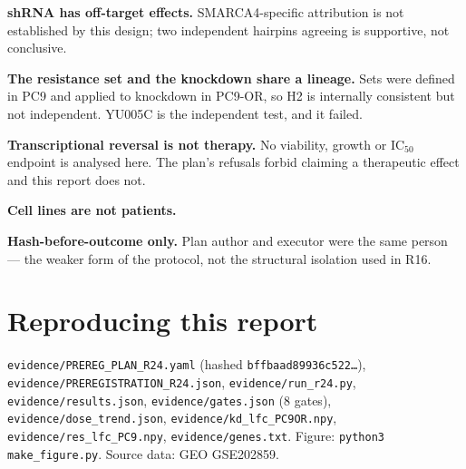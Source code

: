 \documentclass[11pt,a4paper]{article}
\begin{document}
\textbf{shRNA has off-target effects.} SMARCA4-specific attribution is not established by this
design; two independent hairpins agreeing is supportive, not conclusive.

\textbf{The resistance set and the knockdown share a lineage.} Sets were defined in PC9 and applied
to knockdown in PC9-OR, so H2 is internally consistent but not independent. YU005C is the
independent test, and it failed.

\textbf{Transcriptional reversal is not therapy.} No viability, growth or IC$_{50}$ endpoint is
analysed here. The plan's refusals forbid claiming a therapeutic effect and this report does not.

\textbf{Cell lines are not patients.}

\textbf{Hash-before-outcome only.} Plan author and executor were the same person --- the weaker form
of the protocol, not the structural isolation used in R16.

\section*{Reproducing this report}

\texttt{evidence/PREREG\_PLAN\_R24.yaml} (hashed \texttt{bffbaad89936c522\ldots}),
\texttt{evidence/PREREGISTRATION\_R24.json}, \texttt{evidence/run\_r24.py},
\texttt{evidence/results.json}, \texttt{evidence/gates.json} (8 gates),
\texttt{evidence/dose\_trend.json}, \texttt{evidence/kd\_lfc\_PC9OR.npy},
\texttt{evidence/res\_lfc\_PC9.npy}, \texttt{evidence/genes.txt}.
Figure: \texttt{python3 make\_figure.py}. Source data: GEO GSE202859.
\end{document}
